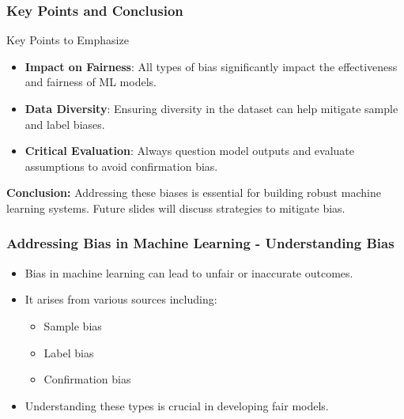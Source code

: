 \documentclass[aspectratio=169]{beamer}
\begin{document}
\begin{frame}[fragile]
    \frametitle{Key Points and Conclusion}
    \begin{block}{Key Points to Emphasize}
        \begin{itemize}
            \item \textbf{Impact on Fairness}: All types of bias significantly impact the effectiveness and fairness of ML models.
            \item \textbf{Data Diversity}: Ensuring diversity in the dataset can help mitigate sample and label biases.
            \item \textbf{Critical Evaluation}: Always question model outputs and evaluate assumptions to avoid confirmation bias.
        \end{itemize}
    \end{block}
    \textbf{Conclusion:} Addressing these biases is essential for building robust machine learning systems. Future slides will discuss strategies to mitigate bias.
\end{frame}

\begin{frame}[fragile]
    \frametitle{Addressing Bias in Machine Learning - Understanding Bias}
    \begin{itemize}
        \item Bias in machine learning can lead to unfair or inaccurate outcomes.
        \item It arises from various sources including:
          \begin{itemize}
            \item Sample bias
            \item Label bias
            \item Confirmation bias
          \end{itemize}
        \item Understanding these types is crucial in developing fair models.
    \end{itemize}
\end{frame}
\end{document}
